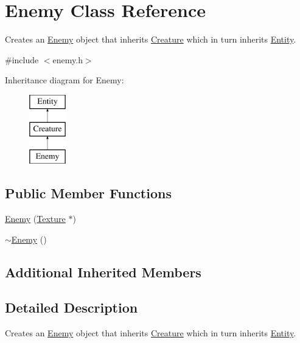 \hypertarget{class_enemy}{\section{Enemy Class Reference}
\label{class_enemy}
}


Creates an \hyperlink{class_enemy}{Enemy} object that inherits \hyperlink{class_creature}{Creature} which in turn inherits \hyperlink{class_entity}{Entity}.  




{\ttfamily \#include $<$enemy.\+h$>$}

Inheritance diagram for Enemy\+:\begin{figure}[H]
\begin{center}
\leavevmode
\includegraphics[height=3.000000cm]{class_enemy}
\end{center}
\end{figure}
\subsection*{Public Member Functions}
\begin{DoxyCompactItemize}
\item 
\hyperlink{class_enemy_ada67a3c9b7166fda1c010a8c7432a355}{Enemy} (\hyperlink{class_texture}{Texture} $\ast$)
\item 
\hyperlink{class_enemy_ac0eec4755e28c02688065f9657150ac3}{$\sim$\+Enemy} ()
\end{DoxyCompactItemize}
\subsection*{Additional Inherited Members}


\subsection{Detailed Description}
Creates an \hyperlink{class_enemy}{Enemy} object that inherits \hyperlink{class_creature}{Creature} which in turn inherits \hyperlink{class_entity}{Entity}. 

